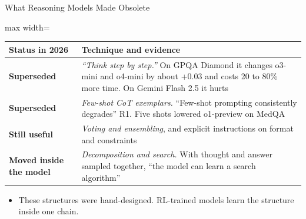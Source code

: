 \begin{frame}{What Reasoning Models Made Obsolete}
    \begin{center}
    \small
    \renewcommand{\arraystretch}{1.05}
    \begin{adjustbox}{max width=\linewidth}\begin{tabular}{>{\raggedright\arraybackslash}p{3.4cm}>{\raggedright\arraybackslash}p{10.4cm}}
        \toprule
        \textbf{Status in 2026} & \textbf{Technique and evidence} \\
        \midrule
        \textbf{Superseded} & \emph{``Think step by step.''} On GPQA Diamond it changes o3-mini and o4-mini by about +0.03 and costs 20 to 80\% more time. On Gemini Flash 2.5 it hurts \\
        \textbf{Superseded} & \emph{Few-shot CoT exemplars.} ``Few-shot prompting consistently degrades'' R1. Five shots lowered o1-preview on MedQA \\
        \rowcolor{KAUSTcyan!12} \textbf{Still useful} & \emph{Voting and ensembling}, and explicit instructions on format and constraints \\
        \textbf{Moved inside the model} & \emph{Decomposition and search.} With thought and answer sampled together, ``the model can learn a search algorithm'' \\
        \bottomrule
    \end{tabular}\end{adjustbox}
    \end{center}
    \begin{itemize}\itemsep0.35em
        \item These structures were hand-designed. RL-trained models learn the structure inside one chain.
    \end{itemize}
\end{frame}

